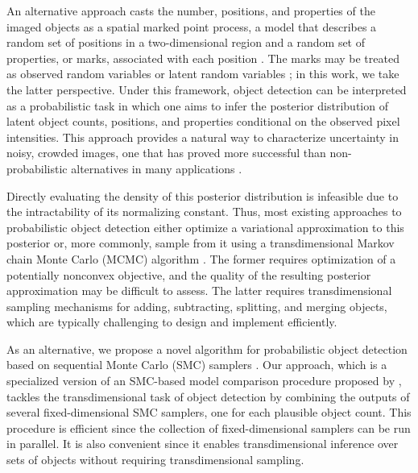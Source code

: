 \documentclass[
  12pt]{article}
\begin{document}
An alternative approach casts the number, positions, and properties of the imaged objects as a spatial marked point process, a model that describes a random set of positions in a two-dimensional region and a random set of properties, or marks, associated with each position \citep{gelfand2018bayesian}. The marks may be treated as observed random variables or latent random variables \citep{descombes2002marked, verdie2014detecting, pham2016efficient, ghanta2018latent}; in this work, we take the latter perspective. Under this framework, object detection can be interpreted as a probabilistic task in which one aims to infer the posterior distribution of latent object counts, positions, and properties conditional on the observed pixel intensities. This approach provides a natural way to characterize uncertainty in noisy, crowded images, one that has proved more successful than non-probabilistic alternatives in many applications \citep{rue1999bayesian, vo2010joint, arteta2013learning}.

Directly evaluating the density of this posterior distribution is infeasible due to the intractability of its normalizing constant. Thus, most existing approaches to probabilistic object detection either optimize a variational approximation to this posterior \citep{greff2019multi, liu2023variational} or, more commonly, sample from it using a transdimensional Markov chain Monte Carlo (MCMC) algorithm \citep{green1995reversible, stephens2000bayesian, shi2002birth}. The former requires optimization of a potentially nonconvex objective, and the quality of the resulting posterior approximation may be difficult to assess. The latter requires transdimensional sampling mechanisms for adding, subtracting, splitting, and merging objects, which are typically challenging to design and implement efficiently.

As an alternative, we propose a novel algorithm for probabilistic object detection based on sequential Monte Carlo (SMC) samplers \citep{chopin2020, dai2022invitation}. Our approach, which is a specialized version of an SMC-based model comparison procedure proposed by \cite{zhou2016toward}, tackles the transdimensional task of object detection by combining the outputs of several fixed-dimensional SMC samplers, one for each plausible object count. This procedure is efficient since the collection of fixed-dimensional samplers can be run in parallel. It is also convenient since it enables transdimensional inference over sets of objects without requiring transdimensional sampling.
\end{document}
